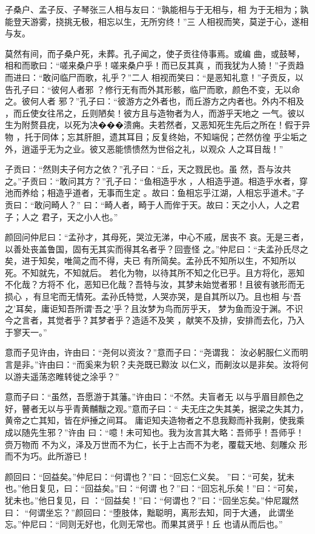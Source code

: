 \documentclass[12pt,UTF8]{ctexbook}
\begin{document}
子桑户、孟子反、子琴张三人相与友曰：“孰能相与于无相与，相 为于无相为；孰能登天游雾，挠挑无极，相忘以生，无所穷终！”三 人相视而笑，莫逆于心，遂相与友。

莫然有间，而子桑户死，未葬。孔子闻之，使子贡往侍事焉。或编 曲，或鼓琴，相和而歌曰：“嗟来桑户乎！嗟来桑户乎！而已反其真 ，而我犹为人猗！”子贡趋而进曰：“敢问临尸而歌，礼乎？”二人 相视而笑曰：“是恶知礼意！”子贡反，以告孔子曰：“彼何人者邪 ？修行无有而外其形骸，临尸而歌，颜色不变，无以命之。彼何人者 邪？”孔子曰：“彼游方之外者也，而丘游方之内者也。外内不相及 ，而丘使女往吊之，丘则陋矣！彼方且与造物者为人，而游乎天地之 一气。彼以生为附赘县疣，以死为决���溃痈。夫若然者，又恶知死生先后之所在！假于异物 ，托于同体；忘其肝胆，遗其耳目；反复终始，不知端倪；芒然仿徨 乎尘垢之外，逍遥乎无为之业。彼又恶能愦愦然为世俗之礼，以观众 人之耳目哉！”

子贡曰：“然则夫子何方之依？”孔子曰：“丘，天之戮民也。虽 然，吾与汝共之。”子贡曰：“敢问其方？”孔子曰：“鱼相造乎水 ，人相造乎道。相造乎水者，穿池而养给；相造乎道者，无事而生定 。故曰：鱼相忘乎江湖，人相忘乎道术。”子贡曰：“敢问畸人？” 曰：“畸人者，畸于人而侔于天。故曰：天之小人，人之君子；人之 君子，天之小人也。”

颜回问仲尼曰：“孟孙才，其母死，哭泣无涕，中心不戚，居丧不 哀。无是三者，以善处丧盖鲁国，固有无其实而得其名者乎？回壹怪 之。”仲尼曰：“夫孟孙氏尽之矣，进于知矣，唯简之而不得，夫已 有所简矣。孟孙氏不知所以生，不知所以死。不知就先，不知就后。 若化为物，以待其所不知之化已乎。且方将化，恶知不化哉？方将不 化，恶知已化哉？吾特与汝，其梦未始觉者邪！且彼有骇形而无损心 ，有旦宅而无情死。孟孙氏特觉，人哭亦哭，是自其所以乃。且也相 与‘吾之’耳矣，庸讵知吾所谓‘吾之’乎？且汝梦为鸟而厉乎天， 梦为鱼而没于渊。不识今之言者，其觉者乎？其梦者乎？造适不及笑 ，献笑不及排，安排而去化，乃入于寥天一。”

意而子见许由，许由曰：“尧何以资汝？”意而子曰：“尧谓我： 汝必躬服仁义而明言是非。”许由曰：“而奚来为轵？夫尧既已黥汝 以仁义，而劓汝以是非矣。汝将何以游夫遥荡恣睢转徙之涂乎？”

意而子曰：“虽然，吾愿游于其藩。”许由曰：“不然。夫盲者无 以与乎眉目颜色之好，瞽者无以与乎青黄黼黻之观。”意而子曰：“ 夫无庄之失其美，据梁之失其力，黄帝之亡其知，皆在炉捶之间耳。 庸讵知夫造物者之不息我黥而补我劓，使我乘成以随先生邪？”许由 曰：“噫！未可知也。我为汝言其大略：吾师乎！吾师乎！赍万物而 不为义，泽及万世而不为仁，长于上古而不为老，覆载天地、刻雕众 形而不为巧。此所游已！

颜回曰：“回益矣。”仲尼曰：“何谓也？”曰：“回忘仁义矣。 ”曰：“可矣，犹未也。”他日复见，曰：“回益矣。”曰：“何谓 也？”曰：“回忘礼乐矣！”曰：“可矣，犹未也。”他日复见，曰 ：“回益矣！”曰：“何谓也？”曰：“回坐忘矣。”仲尼蹴然曰： “何谓坐忘？”颜回曰：“堕肢体，黜聪明，离形去知，同于大通， 此谓坐忘。”仲尼曰：“同则无好也，化则无常也。而果其贤乎！丘 也请从而后也。”
\end{document}
